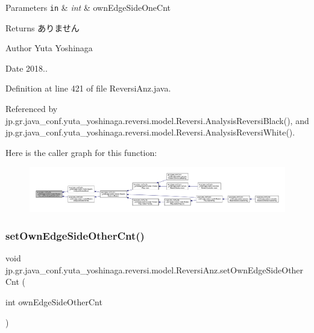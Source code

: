 \begin{DoxyParams}[1]{Parameters}
\mbox{\tt in}  & {\em int} & own\+Edge\+Side\+One\+Cnt \\
\hline
\end{DoxyParams}
\begin{DoxyReturn}{Returns}
ありません 
\end{DoxyReturn}
\begin{DoxyAuthor}{Author}
Yuta Yoshinaga 
\end{DoxyAuthor}
\begin{DoxyDate}{Date}
2018.. 
\end{DoxyDate}


Definition at line 421 of file Reversi\+Anz.\+java.



Referenced by jp.\+gr.\+java\+\_\+conf.\+yuta\+\_\+yoshinaga.\+reversi.\+model.\+Reversi.\+Analysis\+Reversi\+Black(), and jp.\+gr.\+java\+\_\+conf.\+yuta\+\_\+yoshinaga.\+reversi.\+model.\+Reversi.\+Analysis\+Reversi\+White().

Here is the caller graph for this function\+:
\nopagebreak
\begin{figure}[H]
\begin{center}
\leavevmode
\includegraphics[width=350pt]{classjp_1_1gr_1_1java__conf_1_1yuta__yoshinaga_1_1reversi_1_1model_1_1_reversi_anz_a637da35cb4ecce8e7b33c1d96b483a0e_icgraph}
\end{center}
\end{figure}
\mbox{\label{classjp_1_1gr_1_1java__conf_1_1yuta__yoshinaga_1_1reversi_1_1model_1_1_reversi_anz_ac636e4020b682188e70e3b983fd3d4e4}} 
\subsubsection{\texorpdfstring{set\+Own\+Edge\+Side\+Other\+Cnt()}{setOwnEdgeSideOtherCnt()}}
{\footnotesize\ttfamily void jp.\+gr.\+java\+\_\+conf.\+yuta\+\_\+yoshinaga.\+reversi.\+model.\+Reversi\+Anz.\+set\+Own\+Edge\+Side\+Other\+Cnt (\begin{DoxyParamCaption}\item[{int}]{own\+Edge\+Side\+Other\+Cnt }\end{DoxyParamCaption})}



